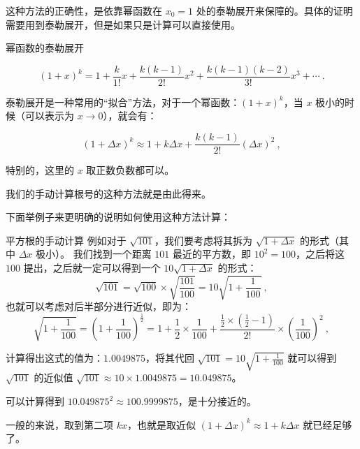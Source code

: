 

这种方法的正确性，是依靠幂函数在 $x_0 = 1$ 处的泰勒展开来保障的。具体的证明需要用到泰勒展开，但是如果只是计算可以直接使用。

\begin{theorem}{幂函数的泰勒展开}

$$(1+x)^k =  1 + \frac{k}{1!} x + \frac{k(k-1)}{2!} x^2 + \frac{k(k-1)(k-2)}{3!} x^3 + \cdots~.$$

\end{theorem}

泰勒展开是一种常用的“拟合”方法，对于一个幂函数：$\left(1+x\right) ^k$，当 $x$ 极小的时候（可以表示为 $x \rightarrow 0$），就会有：

$$(1+\Delta x)^k \approx 1 + k \Delta x + \frac{k(k-1)}{2!}(\Delta x)^2 ~,$$

特别的，这里的 $x$ 取正数负数都可以。

我们的手动计算根号的这种方法就是由此得来。

下面举例子来更明确的说明如何使用这种方法计算：
\begin{example}{平方根的手动计算}
例如对于 $\sqrt{101}$，我们要考虑将其拆为 $\sqrt{1+ \Delta x}$ 的形式（其中 $\Delta x$ 极小）。
我们找到一个距离 $101$ 最近的平方数，即 $10^2 = 100$，之后将这 $100$ 提出，之后就一定可以得到一个 $10 \sqrt{1 + \Delta x}$ 的形式：
$$\sqrt{101} = \sqrt{100} \times \sqrt{\frac{101}{100}}  = 10 \sqrt{1+\frac{1}{100}}~,$$
也就可以考虑对后半部分进行近似，即为：
$$\sqrt{1 + \frac 1{100}} = \left(1 + \frac 1{100}\right)^{\frac 1 2} = 1 + \frac 12 \times \frac 1{100} + \frac{\frac 12 \times (\frac 12 - 1)}{2!} \times \left(\frac 1{100}\right)^2~,$$

计算得出这式的值为：$1.0049875$，将其代回 $\sqrt{101} = 10 \sqrt{1+\frac{1}{100}}$ 就可以得到 $\sqrt{101}$ 的近似值 $\sqrt{101} \approx 10 \times 1.0049875 = 10.049875$。

可以计算得到 $10.049875^2 \approx 100.9999875$，是十分接近的。
\end{example}

一般的来说，取到第二项 $kx$，也就是取近似 $\left(1+\Delta x\right)^k \approx 1 + k \Delta x $ 就已经足够了。

